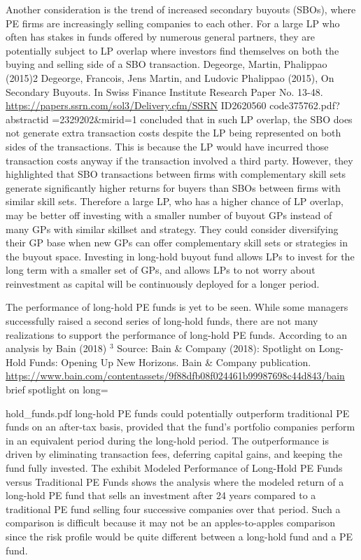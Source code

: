 \documentclass[11pt]{article}
\begin{document}
Another consideration is the trend of increased secondary buyouts (SBOs), where PE firms are increasingly selling companies to each other. For a large LP who often has stakes in funds offered by numerous general partners, they are potentially subject to LP overlap where investors find themselves on both the buying and selling side of a SBO transaction. Degeorge, Martin, Phalippao (2015)2 Degeorge, Francois, Jens Martin, and Ludovic Phalippao (2015), On Secondary Buyouts. In Swiss Finance Institute Research Paper No. 13-48. \href{https://papers.ssrn.com/sol3/Delivery.cfm/SSRN}{https://papers.ssrn.com/sol3/Delivery.cfm/SSRN} ID2620560 code375762.pdf?abstractid =2329202\&mirid=1 concluded that in such LP overlap, the SBO does not generate extra transaction costs despite the LP being represented on both sides of the transactions. This is because the LP would have incurred those transaction costs anyway if the transaction involved a third party. However, they highlighted that SBO transactions between firms with complementary skill sets generate significantly higher returns for buyers than SBOs between firms with similar skill sets. Therefore a large LP, who has a higher chance of LP overlap, may be better off investing with a smaller number of buyout GPs instead of many GPs with similar skillset and strategy. They could consider diversifying their GP base when new GPs can offer complementary skill sets or strategies in the buyout space. Investing in long-hold buyout fund allows LPs to invest for the long term with a smaller set of GPs, and allows LPs to not worry about reinvestment as capital will be continuously deployed for a longer period.

The performance of long-hold PE funds is yet to be seen. While some managers successfully raised a second series of long-hold funds, there are not many realizations to support the performance of long-hold PE funds. According to an analysis by Bain (2018) ${ }^{3}$ Source: Bain \& Company (2018): Spotlight on Long-Hold Funds: Opening Up New Horizons. Bain \& Company publication. \href{https://www.bain.com/contentassets/9f88dfb08f024461b99987698c44d843/bain}{https://www.bain.com/contentassets/9f88dfb08f024461b99987698c44d843/bain} brief spotlight on long=

hold\_funds.pdf long-hold PE funds could potentially outperform traditional PE funds on an after-tax basis, provided that the fund's portfolio companies perform in an equivalent period during the long-hold period. The outperformance is driven by eliminating transaction fees, deferring capital gains, and keeping the fund fully invested. The exhibit Modeled Performance of Long-Hold PE Funds versus Traditional PE Funds shows the analysis where the modeled return of a long-hold PE fund that sells an investment after 24 years compared to a traditional PE fund selling four successive companies over that period. Such a comparison is difficult because it may not be an apples-to-apples comparison since the risk profile would be quite different between a long-hold fund and a PE fund.
\end{document}
